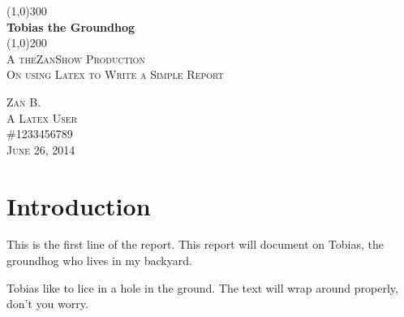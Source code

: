 \documentclass{article}
\begin{document}
\begin{titlepage}
	\begin{center}
	\line(1,0){300} \\
	[0.25in]
	\huge{\bfseries Tobias the Groundhog}\\
	[2mm]
	\line(1,0){200} \\
	[1.5cm]
	\textsc {\LARGE A theZanShow Production}\\
	[0.75cm]
	\textsc{\Large On using Latex to Write a Simple Report} \\
	[9cm]
	\end{center}
	\begin{flushright}
	\textsc{\large Zan B. \\
	A Latex User \\
	\#1233456789\\
	June 26, 2014\\}
	\end{flushright}	
\end{titlepage}

\section{Introduction}\label{sec:intro}
This is the first line of the report. This report will document on Tobias, the groundhog who lives in my backyard.

Tobias like to lice in a hole in the ground. The text will wrap around properly, don't you worry.

\lipsum[1]
\end{document}
